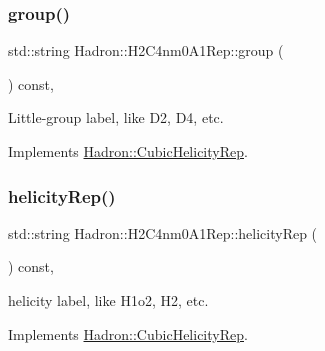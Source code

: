 \mbox{\label{structHadron_1_1H2C4nm0A1Rep_ae21ccc52d2b7461dd5dddbfa46b8f878}} 
\subsubsection{\texorpdfstring{group()}{group()}\hspace{0.1cm}{\footnotesize\ttfamily [5/5]}}
{\footnotesize\ttfamily std\+::string Hadron\+::\+H2\+C4nm0\+A1\+Rep\+::group (\begin{DoxyParamCaption}{ }\end{DoxyParamCaption}) const\hspace{0.3cm}{\ttfamily [inline]}, {\ttfamily [virtual]}}

Little-\/group label, like D2, D4, etc. 

Implements \mbox{\hyperlink{structHadron_1_1CubicHelicityRep_a101a7d76cd8ccdad0f272db44b766113}{Hadron\+::\+Cubic\+Helicity\+Rep}}.

\mbox{\label{structHadron_1_1H2C4nm0A1Rep_a68f777d04db52d25c21b65d117a9fe71}} 
\subsubsection{\texorpdfstring{helicityRep()}{helicityRep()}\hspace{0.1cm}{\footnotesize\ttfamily [1/3]}}
{\footnotesize\ttfamily std\+::string Hadron\+::\+H2\+C4nm0\+A1\+Rep\+::helicity\+Rep (\begin{DoxyParamCaption}{ }\end{DoxyParamCaption}) const\hspace{0.3cm}{\ttfamily [inline]}, {\ttfamily [virtual]}}

helicity label, like H1o2, H2, etc. 

Implements \mbox{\hyperlink{structHadron_1_1CubicHelicityRep_af1096946b7470edf0a55451cc662f231}{Hadron\+::\+Cubic\+Helicity\+Rep}}.

\mbox{\label{structHadron_1_1H2C4nm0A1Rep_a68f777d04db52d25c21b65d117a9fe71}} 
